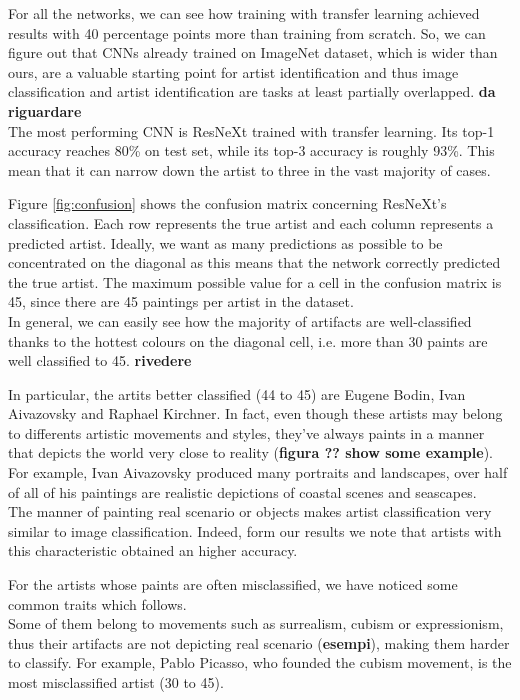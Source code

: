 \documentclass{article}
\begin{document}
For all the networks, we can see how training with transfer learning achieved results with 40 percentage points more than training from scratch. So, we can figure out that CNNs already trained on ImageNet dataset, which is wider than ours,  are a valuable starting point for artist identification and thus image classification and artist identification are tasks at least partially overlapped. \textbf{da riguardare}\\
The most performing CNN is ResNeXt trained with transfer learning. Its top-1 accuracy reaches 80\% on test set, while its top-3 accuracy is roughly 93\%. This mean that it can narrow down the artist to three in the vast majority of cases.

Figure \ref{fig:confusion} shows the confusion matrix concerning ResNeXt's classification. Each row represents the true artist and each column represents a predicted artist. Ideally, we want as many predictions as possible to be concentrated on the diagonal as this means that the network correctly predicted the true artist. The maximum possible value for a cell in the confusion matrix is 45, since there are 45 paintings per artist in the dataset.\\
In general, we can easily see how the majority of artifacts are well-classified thanks to the hottest colours on the diagonal cell, i.e. more than 30 paints are well classified to 45. \textbf{rivedere}

In particular, the artits better classified (44 to 45) are Eugene Bodin, Ivan Aivazovsky and Raphael Kirchner. In fact, even though these artists may belong to differents artistic movements and styles, they've always paints in a manner that depicts the world very close to reality (\textbf{figura ?? show some example}).\\
For example, Ivan Aivazovsky produced many portraits and landscapes, over half of all of his paintings are realistic depictions of coastal scenes and seascapes. \\
The manner of painting real scenario or objects makes artist classification very similar to image classification. Indeed, form our results we note that artists with this characteristic obtained an higher accuracy.

For the artists whose paints are often misclassified, we have noticed some common traits which follows.\\
Some of them belong to movements such as surrealism, cubism or expressionism, thus their artifacts are not depicting real scenario (\textbf{esempi}), making them harder to classify.
For example, Pablo Picasso, who founded the cubism movement, is the most misclassified artist (30 to 45).
  
\end{document}
